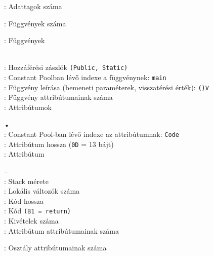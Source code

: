 \begin{compactitem}
\item {}: Adattagok száma
\item {}: Függvények száma
\item {}: Függvények
\begin{compactitem}
    \setlength\itemsep{-5px}
    \item {}     \\
    : Hozzáférési zászlók \lstinline{(Public, Static)} \\
    : Constant Poolban lévő indexe a függvénynek: \lstinline{main} \\
    : Függvény leírása (bemeneti paraméterek, visszatérési érték): \lstinline{()V} \\
    : Függvény attribútumainak száma \\
    : Attribútumok
    \begin{compactitem}
        \setlength\itemsep{-5px}
        \item[•]    \\
        : Constant Pool-ban lévő indexe az attribútumnak: \lstinline{Code} \\
        : Attribútum hossza (\lstinline{0D} = 13 bájt) \\
        : Attribútum
            \begin{compactitem}
            \setlength\itemsep{0px}
                \item[–]       \\
                : Stack mérete  \\
                : Lokális változók száma \\
                : Kód hossza \\
                : Kód \lstinline{(B1 = return)}  \\
                : Kivételek száma \\
                : Attribútum attribútumainak száma
        \end{compactitem}
    \end{compactitem}
\end{compactitem}
\item {}: Osztály attribútumainak száma
\end{compactitem}

